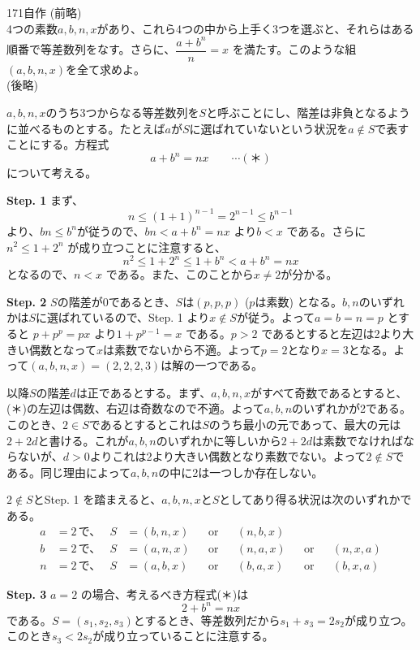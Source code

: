 \begin{prob}{171}{}{自作}
 (前略) \\
 4つの素数$a, b, n, x$があり、これら4つの中から上手く3つを選ぶと、それらはある順番で等差数列をなす。さらに、$\dfrac{a+b^n}{n}=x$ を満たす。このような組$(a, b, n, x)$を全て求めよ。 \\
 (後略)
\end{prob}

$a,b,n,x$のうち3つからなる等差数列を$S$と呼ぶことにし、階差は非負となるように並べるものとする。たとえば$a$が$S$に選ばれていないという状況を$a\notin S$で表すことにする。方程式
\[ a+b^n=nx \qquad\cdots(\text{＊}) \]
について考える。

{\bf \large Step. 1} まず、
\[ n\le (1+1)^{n-1}=2^{n-1}\le b^{n-1} \]
より、$bn\le b^n$が従うので、$bn<a+b^n=nx$ より$b<x$ である。さらに$n^2\le 1+2^n$ が成り立つことに注意すると、
\[ n^2\le 1+2^n\le 1+b^n < a+b^n =nx \]
となるので、$n<x$ である。また、このことから$x\neq 2$が分かる。

{\bf \large Step. 2} $S$の階差が0であるとき、$S$は$(p,p,p)$ ($p$は素数) となる。$b,n$のいずれかは$S$に選ばれているので、Step. 1 より$x\notin S$が従う。よって$a=b=n=p$ とすると $p+p^p=px$ より$1+p^{p-1}=x$ である。$p>2$ であるとすると左辺は2より大きい偶数となって$x$は素数でないから不適。よって$p=2$となり$x=3$となる。よって$(a,b,n,x)=(2,2,2,3)$は解の一つである。

\vspace{1zw}

以降$S$の階差$d$は正であるとする。まず、$a,b,n,x$がすべて奇数であるとすると、(＊)の左辺は偶数、右辺は奇数なので不適。よって$a,b,n$のいずれかが2である。このとき、$2\in S$であるとするとこれは$S$のうち最小の元であって、最大の元は$2+2d$と書ける。これが$a,b,n$のいずれかに等しいから$2+2d$は素数でなければならないが、$d>0$よりこれは2より大きい偶数となり素数でない。よって$2\notin S$である。同じ理由によって$a,b,n$の中に2は一つしか存在しない。

$2\notin S$とStep. 1 を踏まえると、$a,b,n,x$と$S$としてあり得る状況は次のいずれかである。
\begin{align*}
 a&=2 \,\text{で、}& S&=(b,n,x) & &\text{or} & &(n,b,x) & & & &\\
 b&=2 \,\text{で、}& S&=(a,n,x) & &\text{or} & &(n,a,x) & &\text{or} & &(n,x,a) \\
 n&=2 \,\text{で、}& S&=(a,b,x) & &\text{or} & &(b,a,x) & &\text{or} & &(b,x,a)
\end{align*}

{\bf \large Step. 3} $a=2$ の場合、考えるべき方程式(＊)は
\[ 2+b^n=nx \]
である。$S=(s_1,s_2,s_3)$とするとき、等差数列だから$s_1+s_3=2s_2$が成り立つ。このとき$s_3<2s_2$が成り立っていることに注意する。

